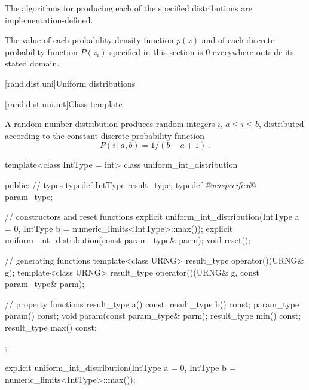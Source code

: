 \pnum
The algorithms
for producing each
of the specified distributions
are implementation-defined.

\pnum
The value of each probability density function $p(z)$
and of each discrete probability function $P(z_i)$
specified in this section
is $0$
everywhere outside its stated domain.


[rand.dist.uni]{Uniform distributions}%
%


[rand.dist.uni.int]{Class template }%
%

\pnum
A  random number distribution
produces random integers $i$,
$ a \leq i \leq b $,
distributed according to
the constant discrete probability function%
%
\[%
 P(i\,|\,a,b) = 1 / (b - a + 1)
\; \mbox{.}
\]

\begin{codeblock}
template<class IntType = int>
 class uniform_int_distribution
{
public:
 // types
 typedef IntType result_type;
 typedef @\textit{unspecified}@ param_type;

 // constructors and reset functions
 explicit uniform_int_distribution(IntType a = 0, IntType b = numeric_limits<IntType>::max());
 explicit uniform_int_distribution(const param_type& parm);
 void reset();

 // generating functions
 template<class URNG>
   result_type operator()(URNG& g);
 template<class URNG>
   result_type operator()(URNG& g, const param_type& parm);

 // property functions
 result_type a() const;
 result_type b() const;
 param_type param() const;
 void param(const param_type& parm);
 result_type min() const;
 result_type max() const;
};
\end{codeblock}


%
\begin{itemdecl}
explicit uniform_int_distribution(IntType a = 0, IntType b = numeric_limits<IntType>::max());
\end{itemdecl}

